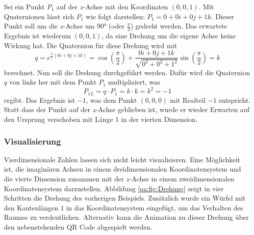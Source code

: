 \begin{beispiel}
    Sei ein Punkt $P_1$ auf der $z$-Achse mit den Koordinaten $(0,0,1)
    $. Mit Quaternionen lässt sich $P_1$ wie folgt darstellen: $P_1 = 0
    + 0i + 0j + 1k$. Dieser Punkt soll um die $z$-Achse um 90° (oder 
    $\frac{\pi}{2}$) gedreht werden. Das erwartete Ergebnis ist 
    wiederum $(0,0,1)$, da eine Drehung um die eigene Achse keine 
    Wirkung hat. Die Quaternion für diese Drehung wird mit 
    \begin{equation*}
        q = e^{\frac{\pi}{2}(0i + 0j + 1k)} 
        = \cos\left(\frac{\pi}{2}\right) 
        + \frac{0i + 0j + 1k}{\sqrt{0^2 + 0^2 + 1^2}}
        \sin\left(\frac{\pi}{2}\right) 
        = k
    \end{equation*}
    berechnet. Nun soll die Drehung durchgeführt werden. Dafür wird die 
    Quaternion $q$ von links her mit dem Punkt $P_1$ multipliziert, was
    \begin{equation*}
        P_{1L} = q \cdot P_1 = k \cdot k = k^2 = -1
    \end{equation*}
    ergibt.
    Das Ergebnis ist $-1$, was dem Punkt $(0,0,0)$ mit Realteil $-1$ entspricht. 
    Statt dass der Punkt auf der $z$-Achse geblieben ist, wurde er wieder Erwarten 
    auf den Ursprung verschoben mit Länge 1 in der vierten Dimension.
\end{beispiel}

\pagebreak
\subsubsection{Visualisierung}

Vierdimensionale Zahlen lassen sich nicht leicht visualisieren. 
Eine Möglichkeit ist, die imaginären Achsen in einem 
dreidimensionalen Koordinatensystem und die vierte Dimension 
zusammen mit der $z$-Achse in einem zweidimensionalen 
Koordinatensystem darzustellen. Abbildung \ref{qa:fig:Drehung} zeigt in vier 
Schritten die Drehung des vorherigen Beispiels. Zusätzlich wurde ein Würfel mit 
den Kantenlängen $1$ in das Koordinatensystem eingefügt, um das Verhalten des Raumes 
zu verdeutlichen.
Alternativ kann die Animation zu dieser Drehung über den nebenstehenden QR Code abgespielt werden.

